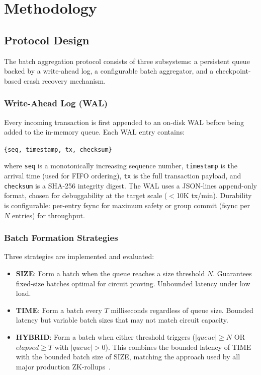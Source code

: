
\section{Methodology}

\subsection{Protocol Design}

The batch aggregation protocol consists of three subsystems: a persistent queue
backed by a write-ahead log, a configurable batch aggregator, and a
checkpoint-based crash recovery mechanism.

\subsubsection{Write-Ahead Log (WAL)}

Every incoming transaction is first appended to an on-disk WAL before being added
to the in-memory queue. Each WAL entry contains:

\begin{center}
\texttt{\{seq, timestamp, tx, checksum\}}
\end{center}

where \texttt{seq} is a monotonically increasing sequence number,
\texttt{timestamp} is the arrival time (used for FIFO ordering), \texttt{tx} is
the full transaction payload, and \texttt{checksum} is a SHA-256 integrity digest.
The WAL uses a JSON-lines append-only format, chosen for debuggability at the
target scale ($<$10K tx/min). Durability is configurable: per-entry fsync for
maximum safety or group commit (fsync per $N$ entries) for throughput.

\subsubsection{Batch Formation Strategies}

Three strategies are implemented and evaluated:

\begin{itemize}
\item \textbf{SIZE}: Form a batch when the queue reaches a size threshold $N$.
  Guarantees fixed-size batches optimal for circuit proving. Unbounded latency
  under low load.
\item \textbf{TIME}: Form a batch every $T$ milliseconds regardless of queue
  size. Bounded latency but variable batch sizes that may not match circuit
  capacity.
\item \textbf{HYBRID}: Form a batch when either threshold triggers
  ($|queue| \geq N$ OR $elapsed \geq T$ with $|queue| > 0$). This combines the
  bounded latency of TIME with the bounded batch size of SIZE, matching the
  approach used by all major production ZK-rollups~\cite{chaliasos2024analyzing}.
\end{itemize}

